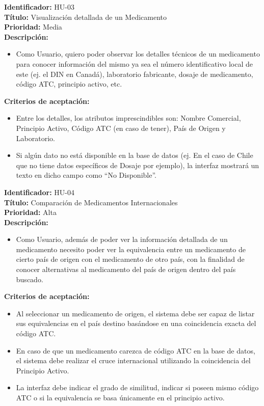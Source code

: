 \documentclass[12pt, a4paper]{report}
\begin{document}
\vspace{0.5cm}
\noindent\textbf{Identificador:} HU-03 \\
\textbf{Título:} Visualización detallada de un Medicamento \\
\textbf{Prioridad:} Media \\
\textbf{Descripción:}
\begin{itemize}
    \item Como Usuario, quiero poder observar los detalles técnicos de un medicamento para conocer información del mismo ya sea el número identificativo local de este (ej. el DIN en Canadá), laboratorio fabricante, dosaje de medicamento, código ATC, principio activo, etc.
\end{itemize}
\textbf{Criterios de aceptación:}
\begin{itemize}
    \item Entre los detalles, los atributos imprescindibles son: Nombre Comercial, Principio Activo, Código ATC (en caso de tener), País de Origen y Laboratorio.
    \item Si algún dato no está disponible en la base de datos (ej. En el caso de Chile que no tiene datos específicos de Dosaje por ejemplo), la interfaz mostrará un texto en dicho campo como ``No Disponible''.
\end{itemize}

\vspace{0.5cm}
\noindent\textbf{Identificador:} HU-04 \\
\textbf{Título:} Comparación de Medicamentos Internacionales \\
\textbf{Prioridad:} Alta \\
\textbf{Descripción:}
\begin{itemize}
    \item Como Usuario, además de poder ver la información detallada de un medicamento necesito poder ver la equivalencia entre un medicamento de cierto país de origen con el medicamento de otro país, con la finalidad de conocer alternativas al medicamento del país de origen dentro del país buscado.
\end{itemize}
\textbf{Criterios de aceptación:}
\begin{itemize}
    \item Al seleccionar un medicamento de origen, el sistema debe ser capaz de listar sus equivalencias en el país destino basándose en una coincidencia exacta del código ATC.
    \item En caso de que un medicamento carezca de código ATC en la base de datos, el sistema debe realizar el cruce internacional utilizando la coincidencia del Principio Activo.
    \item La interfaz debe indicar el grado de similitud, indicar si poseen mismo código ATC o si la equivalencia se basa únicamente en el principio activo.
\end{itemize}
\end{document}
